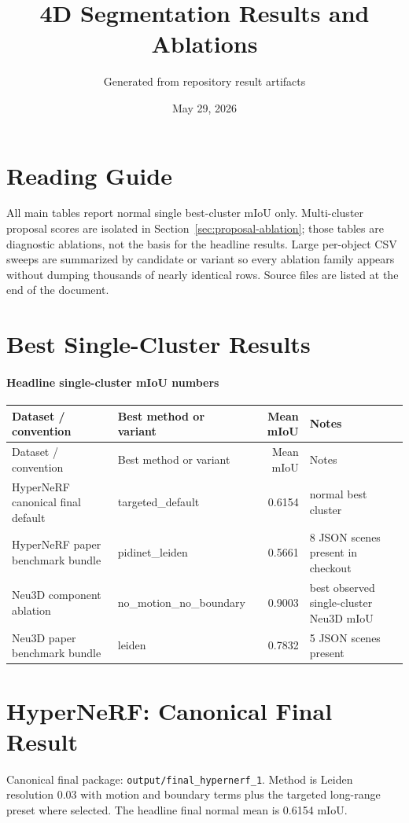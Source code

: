 \documentclass[10pt]{article}
\begin{document}
\title{4D Segmentation Results and Ablations}
\author{Generated from repository result artifacts}
\date{May 29, 2026}
\maketitle
\tableofcontents
\newpage
\section{Reading Guide}
All main tables report normal single best-cluster mIoU only.  Multi-cluster proposal scores are isolated in Section~\ref{sec:proposal-ablation}; those tables are diagnostic ablations, not the basis for the headline results.
Large per-object CSV sweeps are summarized by candidate or variant so every ablation family appears without dumping thousands of nearly identical rows.  Source files are listed at the end of the document.
\section{Best Single-Cluster Results}
\paragraph{Headline single-cluster mIoU numbers}
\small
\begin{longtable}{llrl}
\toprule
Dataset / convention & Best method or variant & Mean mIoU & Notes \\
\midrule
\endfirsthead
\toprule
Dataset / convention & Best method or variant & Mean mIoU & Notes \\
\midrule
\endhead
HyperNeRF canonical final default & targeted\_default & 0.6154 & normal best cluster \\
HyperNeRF paper benchmark bundle & pidinet\_leiden & 0.5661 & 8 JSON scenes present in checkout \\
Neu3D component ablation & no\_motion\_no\_boundary & 0.9003 & best observed single-cluster Neu3D mIoU \\
Neu3D paper benchmark bundle & leiden & 0.7832 & 5 JSON scenes present \\
\bottomrule
\end{longtable}
\normalsize

\section{HyperNeRF: Canonical Final Result}
Canonical final package: \texttt{output/final\_hypernerf\_1}.  Method is Leiden resolution 0.03 with motion and boundary terms plus the targeted long-range preset where selected.  The headline final normal mean is 0.6154 mIoU.
\end{document}
